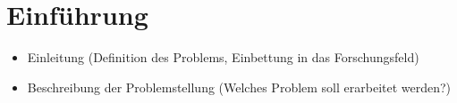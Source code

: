 \chapter{Einführung}
\label{ch:introduction}

\begin{itemize}
\item Einleitung (Definition des Problems, Einbettung in das Forschungsfeld)
\item Beschreibung der Problemstellung (Welches Problem soll erarbeitet werden?)
\end{itemize}